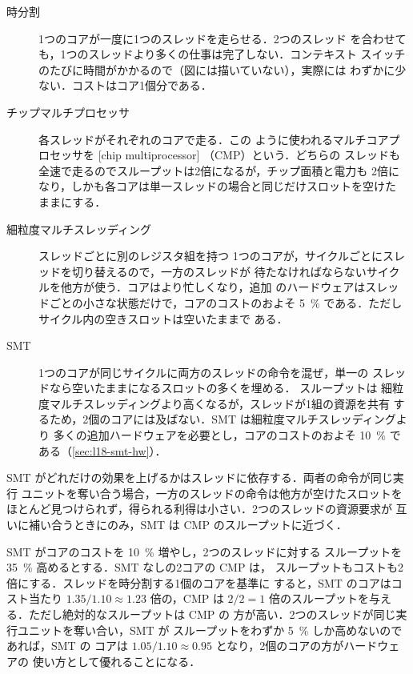 \documentclass[../main.tex]{subfiles}
\begin{document}
\begin{description}
  \item[時分割] 1つのコアが一度に1つのスレッドを走らせる．2つのスレッド
    を合わせても，1つのスレッドより多くの仕事は完了しない．コンテキスト
    スイッチのたびに時間がかかるので（図には描いていない），実際には
    わずかに少ない．コストはコア1個分である．
  \item[チップマルチプロセッサ] 各スレッドがそれぞれのコアで走る．この
    ように使われるマルチコアプロセッサを
    [chip multiprocessor]%
    （CMP）という．どちらの
    スレッドも全速で走るのでスループットは2倍になるが，チップ面積と電力も
    2倍になり，しかも各コアは単一スレッドの場合と同じだけスロットを空けた
    ままにする．
  \item[細粒度マルチスレッディング] スレッドごとに別のレジスタ組を持つ
    1つのコアが，サイクルごとにスレッドを切り替えるので，一方のスレッドが
    待たなければならないサイクルを他方が使う．コアはより忙しくなり，追加
    のハードウェアはスレッドごとの小さな状態だけで，コアのコストのおよそ
    \SI{5}{\percent} である．ただしサイクル内の空きスロットは空いたままで
    ある．
  \item[SMT] 1つのコアが同じサイクルに両方のスレッドの命令を混ぜ，単一の
    スレッドなら空いたままになるスロットの多くを埋める．%
    スループットは
    細粒度マルチスレッディングより高くなるが，スレッドが1組の資源を共有
    するため，2個のコアには及ばない．SMT は細粒度マルチスレッディングより
    多くの追加ハードウェアを必要とし，コアのコストのおよそ
    \SI{10}{\percent} である（\cref{sec:l18-smt-hw}）．
\end{description}

SMT がどれだけの効果を上げるかはスレッドに依存する．両者の命令が同じ実行
ユニットを奪い合う場合，一方のスレッドの命令は他方が空けたスロットを
ほとんど見つけられず，得られる利得は小さい．2つのスレッドの資源要求が
互いに補い合うときにのみ，SMT は CMP のスループットに近づく．

\begin{example}
  \label{ex:l18-smt-cmp}
  SMT がコアのコストを \SI{10}{\percent} 増やし，2つのスレッドに対する
  スループットを \SI{35}{\percent} 高めるとする．SMT なしの2コアの CMP は，
  スループットもコストも2倍にする．スレッドを時分割する1個のコアを基準に
  すると，SMT のコアはコスト当たり $1.35/1.10\approx 1.23$ 倍の，CMP は
  $2/2=1$ 倍のスループットを与える．ただし絶対的なスループットは CMP の
  方が高い．2つのスレッドが同じ実行ユニットを奪い合い，SMT が
  スループットをわずか \SI{5}{\percent} しか高めないのであれば，SMT の
  コアは $1.05/1.10\approx 0.95$ となり，2個のコアの方がハードウェアの
  使い方として優れることになる．
\end{example}
\end{document}
